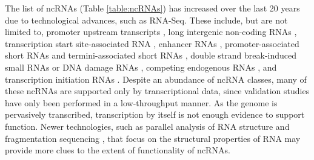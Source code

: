 The list of ncRNAs (Table \ref{table:ncRNAs}) has increased over the last 20 years due to technological advances, such as RNA-Seq. These include, but are not limited to, promoter upstream transcripts \citep{pmid19056938}, long intergenic non-coding RNAs \citep{pmid21890647, pmid22196729, pmid2943744}, transcription start site-associated RNA \citep{pmid21822281}, enhancer RNAs \citep{pmid20393465}, promoter-associated short RNAs and termini-associated short RNAs \citep{pmid17510325}, double strand break-induced small RNAs \citep{pmid22445173} or DNA damage RNAs \citep{francia2012site}, competing endogenous RNAs \citep{pmid24429633}, and transcription initiation RNAs \citep{pmid19377478}. Despite an abundance of ncRNA classes, many of these ncRNAs are supported only by transcriptional data, since validation studies have only been performed in a low-throughput manner. As the genome is pervasively transcribed, transcription by itself is not enough evidence to support function. Newer technologies, such as parallel analysis of RNA structure \citep{pmid20811459} and fragmentation sequencing \citep{pmid21057495}, that focus on the structural properties of RNA may provide more clues to the extent of functionality of ncRNAs.

